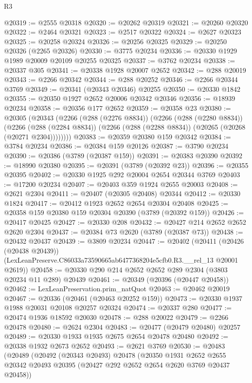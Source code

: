\begin{lexlean}{R3}
\begin{coremodule}
@20319 := @2555 @20318
@20320 := @20262 @20319
@20321 := @20260 @20320
@20322 := @2464 @20321
@20323 := @2517 @20322
@20324 := @2627 @20323
@20325 := @20258 @20324
@20326 := @20256 @20325
@20329 := @20250 @20326 (@2265 @20326)
@20330 := @3775 @20234
@20336 := @20330 @1929 @1989 @20009 @20109 @20255 @20325
@20337 := @3762 @20234
@20338 := @20337 @305
@20341 := @20338 @1928 @20007 @2652
@20342 := @288 @20019
@20343 := @2266 @20342
@20344 := @288 @20252
@20346 := @2266 @20344 @3769
@20349 := @20341 (@20343 @20346) @20255
@20350 := @20330 @1842
@20355 := @20350 @1927 @2652 @20006 @20342 @20346
@20356 := @18939 @20234
@20358 := @20356 @177 @2652
@20359 := @20358 @23
@20380 := @20305
    (@20343
      (@2266
        (@288 (@2276 @8834))
        (@2266
          (@288 (@2280 @8834))
          (@2266
            (@288 (@2284 @8834))
            (@2266 (@288 (@2288 @8834)) (@20265 (@20268 (@20271 @2304))))))))
@20383 := @20359 @20380 @159 @20342
@20384 := @3784 @20234
@20386 := @20384 @159 @20126
@20387 := @3790 @20234
@20390 := @20386 (@3789 (@20387 @159))
@20391 := @20383 @20390
@20392 := @18990 @20380
@20395 := @20391 (@3789 (@20392 @23))
@20396 := @20355 @20395
@20402 := @20330 @1925 @292 @20004 @2654 @20344 @3769
@20403 := @17200 @20234
@20407 := @20403 @359 @1924 @2655 @20003
@20408 := @2621 @2304
@20411 := @20407 (@20305 @20408) @20344
@20412 := @20330 @1824
@20417 := @20412 @1923 @2652 @2654 @20304 @20408
@20425 := @20358 @159 @20380 @159 @20304 @20390 (@3789 (@20392 @159))
@20426 := @20417 @20425
@20427 := @20330 @208
@20432 := @20427 @214 @2652 @2652 @2620 @2304
@20437 := @20384 @73 @2620 (@3789 (@20387 @73))
@20438 := @20432 @20437
@20439 := @3809 @20234
@20447 := @20402
    (@20411
      (@20426 (@20438 @20439))
      (LexLeanPreserve.C86033a73590665ab6477368204e5cfb0.R3.__rel_13 @20001 @2619))
@20458 := @20330 @290 @214 @2652 @2652 @289 @2304 (@3803 @20234 @11 @289) @20439
@20461 := @20349 (@20396 (@20447 @20458))
@20462 := LexLeanPreservation.prim_natQuot
@20463 := @20462 @20019
@20467 := @20336 (@20461 (@20463 @20252 @159))
@20473 := @20330 @1937 @1988 @20031 @20108 @20257 @20324
@20474 := @20337 @280
@20477 := @20474 @1936 @18592 @20030
@20478 := @288 @20022
@20479 := @2266 @20478
@20480 := @2624 @2304
@20483 := @20477 (@20479 @20480) @20257
@20489 := @20330 @1933 @1935 @2675 @2654 @20478 @20480
@20492 := @20338 @1932 @2673 @2652
@20493 := @2621 @3769
@20530 := @20483
    (@20489
      (@20492
        (@20343 @20493)
        @20478
        (@20350
          @1931
          @2652
          @2655
          @20342
          @20493
          @20395
          (@20427 @292 @2652 @2654 @2620 @3769 @20437 @20458))

\end{coremodule}
\end{lexlean}
